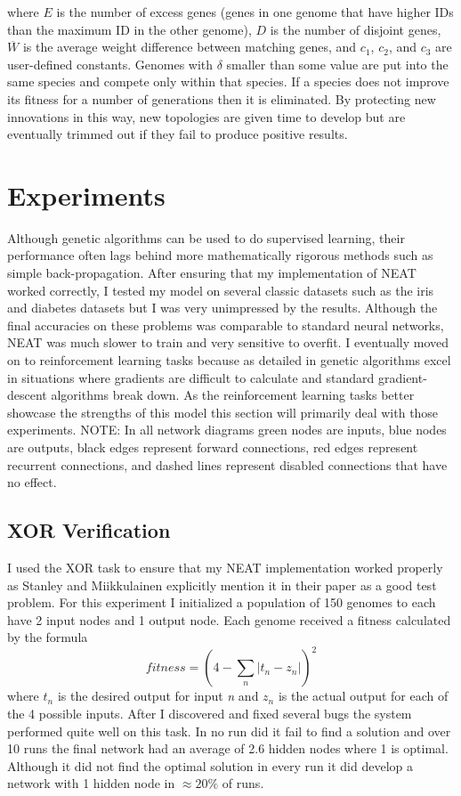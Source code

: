 \documentclass[twocolumn,letterpaper]{article}
\begin{document}
where $E$ is the number of excess genes (genes in one genome that have higher IDs than the maximum
ID in the other genome), $D$ is the number of disjoint genes, $\overline{W}$ is the average weight
difference between matching genes, and $c_1$, $c_2$, and $c_3$ are user-defined constants. Genomes with 
$\delta$ smaller than some value are put into the same species and compete only within that species. If a
species does not improve its fitness for a number of generations then it is eliminated. By protecting new
innovations in this way, new topologies are given time to develop but are eventually trimmed out if they 
fail to produce positive results.


  
\section{Experiments} \label{sec:experiments}
Although genetic algorithms can be used to do supervised learning, their performance often lags behind
more mathematically rigorous methods such as simple back-propagation. After ensuring that my implementation of NEAT worked correctly, I tested my model on several classic datasets such as the iris and diabetes datasets but I was very unimpressed by the
results. Although the final accuracies on these problems was comparable to standard neural networks, NEAT was 
much slower to train and very sensitive to overfit. I eventually moved on to reinforcement learning tasks
because as detailed in \cite{whitley} genetic algorithms excel in situations where gradients are difficult to
calculate and standard gradient-descent algorithms break down. As the reinforcement learning tasks better
showcase the strengths of this model this section will primarily deal with those experiments. NOTE: In all
network diagrams green nodes are inputs, blue nodes are outputs, black edges represent forward connections,
red edges represent recurrent connections, and dashed lines represent disabled connections that have no
effect.

\subsection{XOR Verification} \label{sec:xor}
I used the XOR task to ensure that my NEAT implementation worked properly as Stanley and 
Miikkulainen explicitly mention it in their paper as a good test problem. For this experiment I 
initialized a population of 150 genomes to each have 2 input nodes and 1 output node. Each genome received
a fitness calculated by the formula 
\begin{equation}
fitness = (4-\sum_{n} \left|t_n-z_n\right|)^2 
\end{equation}
where $t_n$ is the desired output for input \textit{n} and $z_n$ is the actual output for each of the 4
possible inputs. After I discovered and fixed several bugs the system performed quite well on this task. 
In no run did it fail to find a solution and over 10 runs the final network had an average of 2.6 hidden
nodes where 1 is optimal. Although it did not find the optimal solution in every run it did develop a 
network with 1 hidden node in $\approx20\%$ of runs.
\end{document}
